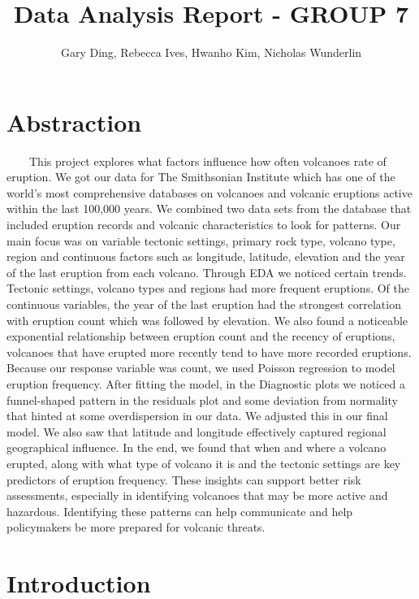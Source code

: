 \documentclass[
  12pt,
]{article}
\title{Data Analysis Report - GROUP 7}
\author{Gary Ding, Rebecca Ives, Hwanho Kim, Nicholas Wunderlin}
\date{}
\begin{document}
\maketitle

{
\setcounter{tocdepth}{2}
\tableofcontents
}
\section{Abstraction}\label{abstraction}

~~~~This project explores what factors influence how often volcanoes
rate of eruption. We got our data for The Smithsonian Institute which
has one of the world's most comprehensive databases on volcanoes and
volcanic eruptions active within the last 100,000 years. We combined two
data sets from the database that included eruption records and volcanic
characteristics to look for patterns. Our main focus was on variable
tectonic settings, primary rock type, volcano type, region and
continuous factors such as longitude, latitude, elevation and the year
of the last eruption from each volcano. Through EDA we noticed certain
trends. Tectonic settings, volcano types and regions had more frequent
eruptions. Of the continuous variables, the year of the last eruption
had the strongest correlation with eruption count which was followed by
elevation. We also found a noticeable exponential relationship between
eruption count and the recency of eruptions, volcanoes that have erupted
more recently tend to have more recorded eruptions. Because our response
variable was count, we used Poisson regression to model eruption
frequency. After fitting the model, in the Diagnostic plots we noticed a
funnel-shaped pattern in the residuals plot and some deviation from
normality that hinted at some overdispersion in our data. We adjusted
this in our final model. We also saw that latitude and longitude
effectively captured regional geographical influence. In the end, we
found that when and where a volcano erupted, along with what type of
volcano it is and the tectonic settings are key predictors of eruption
frequency. These insights can support better risk assessments,
especially in identifying volcanoes that may be more active and
hazardous. Identifying these patterns can help communicate and help
policymakers be more prepared for volcanic threats.

\section{Introduction}\label{introduction}
\end{document}
